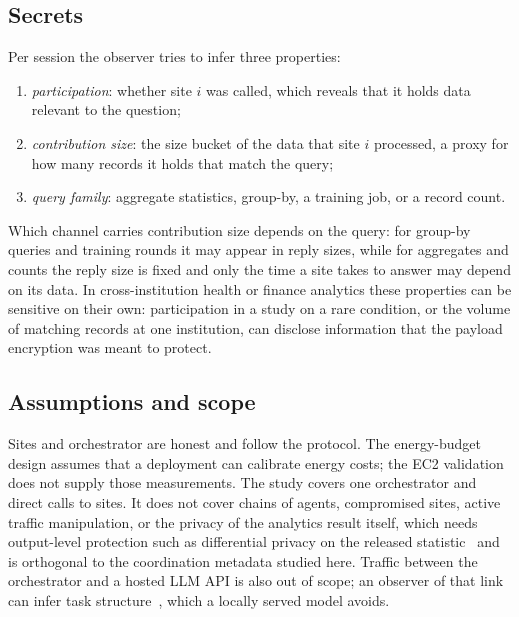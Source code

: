\subsection{Secrets}
Per session the observer tries to infer three properties:
\begin{enumerate}[label=(\roman*),noitemsep,topsep=2pt]
\item \emph{participation}: whether site $i$ was called, which reveals that it holds data relevant to the question;
\item \emph{contribution size}: the size bucket of the data that site $i$ processed, a proxy for how many records it holds that match the query;
\item \emph{query family}: aggregate statistics, group-by, a training job, or a record count.
\end{enumerate}
Which channel carries contribution size depends on the query: for group-by queries and training rounds it may appear in reply sizes, while for aggregates and counts the reply size is fixed and only the time a site takes to answer may depend on its data. In cross-institution health or finance analytics these properties can be sensitive on their own: participation in a study on a rare condition, or the volume of matching records at one institution, can disclose information that the payload encryption was meant to protect.

\subsection{Assumptions and scope}
Sites and orchestrator are honest and follow the protocol. The energy-budget design assumes that a deployment can calibrate energy costs; the EC2 validation does not supply those measurements. The study covers one orchestrator and direct calls to sites. It does not cover chains of agents, compromised sites, active traffic manipulation, or the privacy of the analytics result itself, which needs output-level protection such as differential privacy on the released statistic~\cite{dwork2014algorithmic} and is orthogonal to the coordination metadata studied here. Traffic between the orchestrator and a hosted LLM API is also out of scope; an observer of that link can infer task structure~\cite{pouryousef2026benchmark}, which a locally served model avoids.
